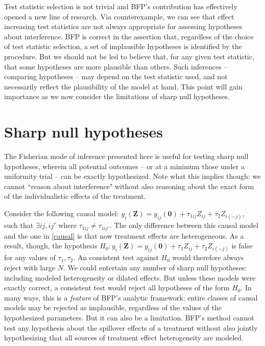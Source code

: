 \documentclass[12pt]{article}
\newcommand{\Z}{\mathbf{Z}}
\newcommand{\0}{\mathbf{0}}
\begin{document}
Test statistic selection is not trivial and BFP's contribution has effectively opened a new line of research. Via counterexample, we can see that effect increasing test statistics are not always appropriate for assessing hypotheses about interference. BFP is correct in the assertion that, regardless of the choice of test statistic selection, a set of implausible hypotheses is identified by the procedure. But we should not be led to believe that, for any given test statistic, that some hypotheses are more plausible than others. Such inferences -- comparing hypotheses -- may depend on the test statistic used, and not necessarily reflect the plausibility of the model at hand. This point will gain importance as we now consider the limitations of sharp null hypotheses.

\section*{Sharp null hypotheses}

The Fisherian mode of inference presented here is useful for testing sharp null hypotheses, wherein all potential outcomes -- or at a minimum those under a uniformity trial -- can be exactly hypothesized. 
Note what this implies though: we cannot ``reason about interference" without also reasoning about the exact form of the individualistic effects of the treatment. 

Consider the following causal model:
$
y_i(\Z) =  y_{ij}(\0) + \tau_{1ij} Z_{ij} + \tau_2 Z_{i(-j)},
$
such that $\exists ij, ij'$ where $\tau_{1ij} \neq \tau_{1ij'}$.
The only difference between this causal model and the one in \eqref{causal} is that now treatment effects are heterogeneous. As a result, though, the hypothesis $H_0: y_i(\Z) =  y_{ij}(\0) + \tau_{1} Z_{ij} + \tau_2 Z_{i(-j)}$ is false for  any values of $\tau_{1}, \tau_{2}$. An consistent test against $H_0$ would therefore always reject with large $N$. We could entertain any number of sharp null hypotheses: including modeled heterogeneity or dilated effects. But unless these models were exactly correct, a consistent test would reject all hypotheses of the form $H_0$. In many ways, this is a {\it feature} of BFP's analytic framework: entire classes of causal models may be rejected as implausible, regardless of the values of the hypothesized parameters. But it can also be a limitation. BFP's method cannot test any hypothesis about the spillover effects of a treatment without also jointly hypothesizing that all sources of treatment effect heterogeneity are modeled.
\end{document}
